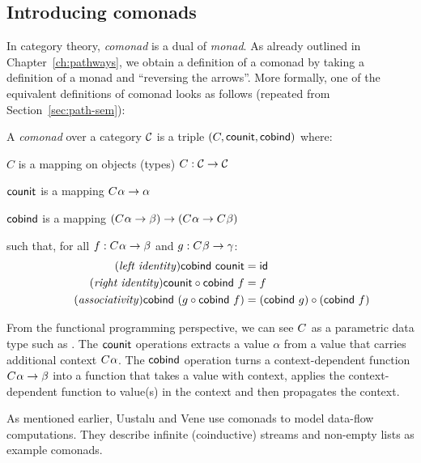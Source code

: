 \subsection{Introducing comonads}

In category theory, \emph{comonad} is a dual of \emph{monad}. As already outlined in
Chapter~\ref{ch:pathways}, we obtain a definition of a comonad by taking a definition of a monad 
and ``reversing the arrows''. More formally, one of the equivalent definitions of comonad 
looks as follows (repeated from Section~\ref{sec:path-sem}):

\begin{definition}
A \emph{comonad} over a category $\mathcal{C}$ is a triple $(C, \textnormal{\sffamily counit}, \textnormal{\sffamily cobind})$ where:
\begin{compactitem}
\item $C$ is a mapping on objects (types) $C : \mathcal{C} \rightarrow \mathcal{C}$
\item $\textnormal{\sffamily counit}$ is a mapping $C^{}\alpha \rightarrow \alpha$ 
\item $\textnormal{\sffamily cobind}$ is a mapping $(C^{}\alpha \rightarrow \beta) 
  \rightarrow (C^{}\alpha \rightarrow C^{}\beta)$
\end{compactitem}
such that, for all $f:C^{}\alpha \rightarrow \beta$ and $g:C^{}\beta \rightarrow \gamma$:
\begin{align}
\tag{\emph{left identity}}
  \ident{cobind}~\ident{counit} &= \idf{}
  \\
\tag{\emph{right identity}}
  \ident{counit} \circ \ident{cobind}~f &= f
  \\
\tag{\emph{associativity}}
  \ident{cobind}~(g \circ \ident{cobind}~f) &= (\ident{cobind}~g) \circ (\ident{cobind}~f)
\end{align}
\end{definition}

\noindent
From the functional programming perspective, we can see $C^{}$ as a parametric data type such as
. The $\textnormal{\sffamily counit}$ operations extracts a value $\alpha$ from a value that carries 
additional context $C^{}\alpha$. The $\textnormal{\sffamily cobind}$ operation turns a context-dependent function 
$C^{}\alpha \rightarrow \beta$ into a function that takes a value with context, applies
the context-dependent function to value(s) in the context and then propagates the context.

As mentioned earlier, Uustalu and Vene \cite{comonads-notions} use comonads to model data-flow
computations. They describe infinite (coinductive) streams and non-empty lists as example comonads.

